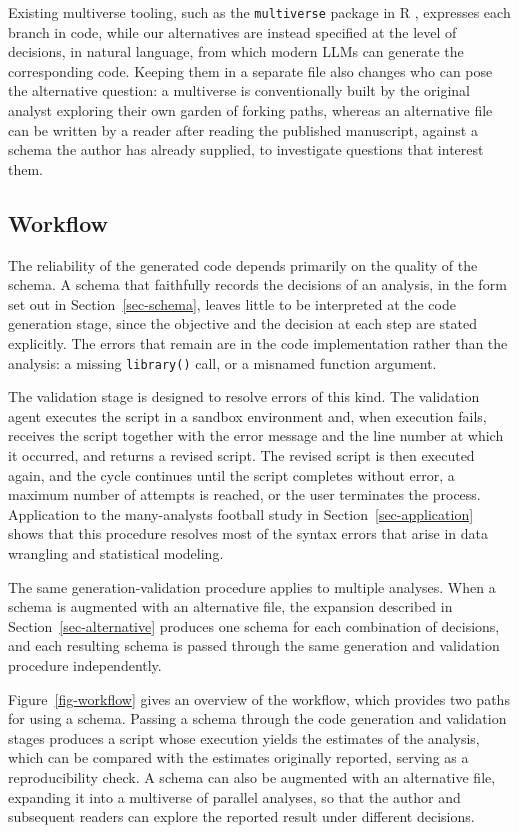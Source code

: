 \documentclass[aoas]{imsart}
\begin{document}
Existing multiverse tooling, such as the \texttt{multiverse} package in
R \citep{sarma2023}, expresses each branch in code, while our
alternatives are instead specified at the level of decisions, in natural
language, from which modern LLMs can generate the corresponding code.
Keeping them in a separate file also changes who can pose the
alternative question: a multiverse is conventionally built by the
original analyst exploring their own garden of forking paths, whereas an
alternative file can be written by a reader after reading the published
manuscript, against a schema the author has already supplied, to
investigate questions that interest them.

\subsection{Workflow}\label{sec-workflow}

The reliability of the generated code depends primarily on the quality
of the schema. A schema that faithfully records the decisions of an
analysis, in the form set out in Section~\ref{sec-schema}, leaves little
to be interpreted at the code generation stage, since the objective and
the decision at each step are stated explicitly. The errors that remain
are in the code implementation rather than the analysis: a missing
\texttt{library()} call, or a misnamed function argument.

The validation stage is designed to resolve errors of this kind. The
validation agent executes the script in a sandbox environment and, when
execution fails, receives the script together with the error message and
the line number at which it occurred, and returns a revised script. The
revised script is then executed again, and the cycle continues until the
script completes without error, a maximum number of attempts is reached,
or the user terminates the process. Application to the many-analysts
football study in Section~\ref{sec-application} shows that this
procedure resolves most of the syntax errors that arise in data
wrangling and statistical modeling.

The same generation-validation procedure applies to multiple analyses.
When a schema is augmented with an alternative file, the expansion
described in Section~\ref{sec-alternative} produces one schema for each
combination of decisions, and each resulting schema is passed through
the same generation and validation procedure independently.

Figure~\ref{fig-workflow} gives an overview of the workflow, which
provides two paths for using a schema. Passing a schema through the code
generation and validation stages produces a script whose execution
yields the estimates of the analysis, which can be compared with the
estimates originally reported, serving as a reproducibility check. A
schema can also be augmented with an alternative file, expanding it into
a multiverse of parallel analyses, so that the author and subsequent
readers can explore the reported result under different decisions.
\end{document}
